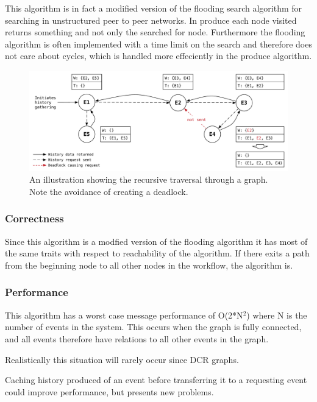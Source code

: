 	\newpar This algorithm is in fact a modified version of the flooding search algorithm for searching in unstructured peer to peer networks. In produce each node visited returns something and not only the searched for node. Furthermore the flooding algorithm is often implemented with a time limit on the search and therefore does not care about cycles, which is handled more effeciently in the produce algorithm.
	
	\begin{figure}[H]
		\centering
		\includegraphics[width=\textwidth]{4connect/images/recursive.pdf}
		\caption{An illustration showing the recursive traversal through a graph. Note the avoidance of creating a deadlock.}
		\label{fig:connecting:recursive}
	\end{figure}
	
	\subsubsection{Correctness}
	Since this algorithm is a modfied version of the flooding algorithm it has most of the same traits with respect to reachability of the algorithm. If there exits a path from the beginning node to all other nodes in the workflow, the algorithm is. 
	
	\subsubsection{Performance}
	This algorithm has a worst case message performance of O(2*N$^2$) where N is the number of events in the system. This occurs when the graph is fully connected, and all events therefore have relations to all other events in the graph. 
	
	Realistically this situation will rarely occur since DCR graphs. 
	
	\newpar Caching history produced of an event before transferring it to a requesting event could improve performance, but presents new problems. 
	
